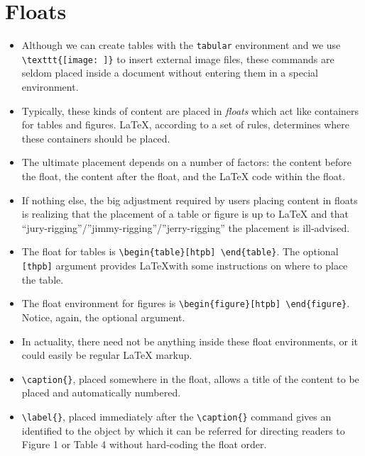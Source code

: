 \section{Floats}

\begin{itemize}

\item Although we can create tables with the \texttt{tabular} environment and we
  use \verb!\texttt{[image: ]}! to insert external image files, these commands
  are seldom placed inside a document without entering them in a special
  environment.

\item Typically, these kinds of content are placed in \textit{floats} which act
  like containers for tables and figures. \LaTeX{}, according to a set of rules,
  determines where these containers should be placed.

\item The ultimate placement depends on a number of factors: the content before
  the float, the content after the float, and the \LaTeX{} code within the
  float.

\item If nothing else, the big adjustment required by users placing content in
  floats is realizing that the placement of a table or figure is up to \LaTeX{}
  and that ``jury-rigging''/''jimmy-rigging''/''jerry-rigging'' the placement is
  ill-advised.

\item The float for tables is \verb!\begin{table}[htpb] \end{table}!. The
  optional \verb![thpb]!  argument provides \LaTeX with some instructions on
  where to place the table.

\item The float environment for figures is
  \verb!\begin{figure}[htpb] \end{figure}!. Notice, again, the optional
  argument.

\item In actuality, there need not be anything inside these float
  environments, or it could easily be regular \LaTeX{} markup.

\item \verb!\caption{}!, placed somewhere in the float, allows a title
  of the content to be placed and automatically numbered.

\item \verb!\label{}!, placed immediately after the \verb!\caption{}!
  command gives an identified to the object by which it can be
  referred for directing readers to Figure 1 or Table 4 without
  hard-coding the float order.


\end{itemize}
